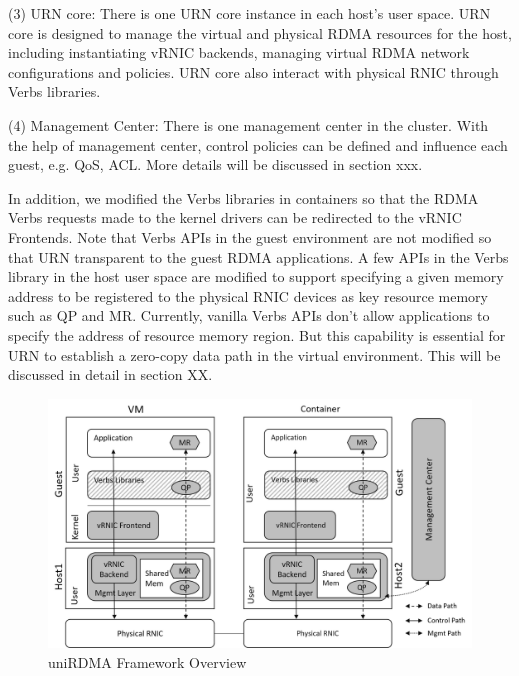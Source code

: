 (3) URN core: There is one URN core instance in each host's user space. URN core is designed to manage the virtual and physical RDMA resources for the host, including instantiating vRNIC backends, managing virtual RDMA network configurations and policies. URN core also interact with physical RNIC through Verbs libraries. 

(4) Management Center: There is one management center in the cluster. With the help of management center, control policies can be defined and influence each guest, e.g. QoS, ACL. More details will be discussed in section xxx.

In addition,  we modified the Verbs libraries in containers so that the RDMA Verbs requests made to the kernel drivers can be redirected to the vRNIC Frontends. Note that Verbs APIs in the guest environment are not modified so that URN transparent to the guest RDMA applications. A few APIs in the Verbs library in the host user space are modified to support specifying a given memory address to be registered to the physical RNIC devices as key resource memory such as QP and MR. Currently, vanilla Verbs APIs don't allow applications to specify the address of resource memory region. But this capability is essential for URN to establish a zero-copy data path in the virtual environment. This will be discussed in detail in section XX.

\begin{figure}[!ht]
	\centering
	\includegraphics[width=1\linewidth]{images/framework-overview.png}
	\caption{uniRDMA Framework Overview}
	\label{fig:framework-overview}
\end{figure}